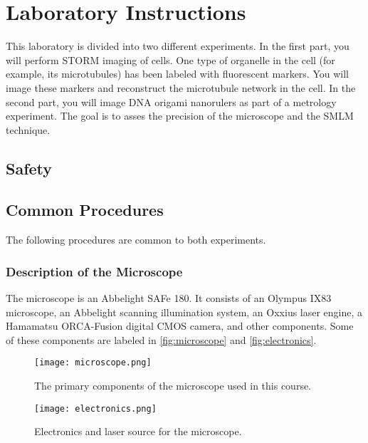 \documentclass[10pt,a4paper,oneside]{book}
\begin{document}
\chapter{Laboratory Instructions}

This laboratory is divided into two different experiments. In the first part, you will perform STORM imaging of cells. One type of organelle in the cell (for example, its microtubules) has been labeled with fluorescent markers. You will image these markers and reconstruct the microtubule network in the cell. In the second part, you will image DNA origami nanorulers as part of a metrology experiment. The goal is to asses the precision of the microscope and the SMLM technique.

\section{Safety}

\newline

\section{Common Procedures}

The following procedures are common to both experiments.

\subsection{Description of the Microscope}

The microscope is an Abbelight SAFe 180. It consists of an Olympus IX83 microscope, an Abbelight scanning illumination system, an Oxxius laser engine, a Hamamatsu ORCA-Fusion digital CMOS camera, and other components. Some of these components are labeled in \autoref{fig:microscope} and \autoref{fig:electronics}.

\begin{figure}[ht]
    \centering
    \texttt{[image: microscope.png]}
    \caption{The primary components of the microscope used in this course.}
    \label{fig:microscope}
\end{figure}

\begin{figure}[ht]
    \centering
    \texttt{[image: electronics.png]}
    \caption{Electronics and laser source for the microscope.}
    \label{fig:electronics}
\end{figure}
\end{document}
